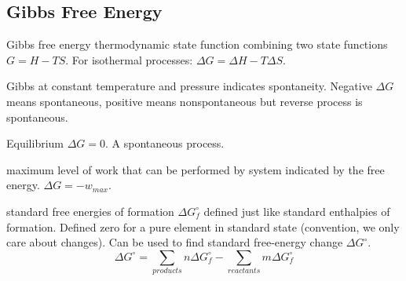 \begin{mdframed}
\begin{multicols}{2}
\subsection{Gibbs Free Energy}
\begin{compactdesc}
    \item[Gibbs free energy] thermodynamic state function combining two state
        functions $G = H - TS$. For isothermal processes: $\Delta G = \Delta H
        - T \Delta S$.
    \item[Gibbs at constant] temperature and pressure indicates spontaneity.
        Negative $\Delta G$ means spontaneous, positive means nonspontaneous
        but reverse process is spontaneous.
    \item[Equilibrium] $\Delta G = 0$. A spontaneous process.
    \item[maximum level of work] that can be performed by system indicated by
        the free energy. $\Delta G = -w_{max}$.
    \item[standard free energies of formation] $\Delta G^\circ_f$ defined
        just like standard enthalpies of formation. Defined zero for a pure
        element in standard state (convention, we only care about changes).
        Can be used to find standard free-energy change $\Delta G^\circ$.
        \[
            \Delta G^\circ = \sum_{products}  n\Delta G^\circ_f
                           - \sum_{reactants} m\Delta G^\circ_f
        \]

\end{compactdesc}
\end{multicols}
\end{mdframed}






